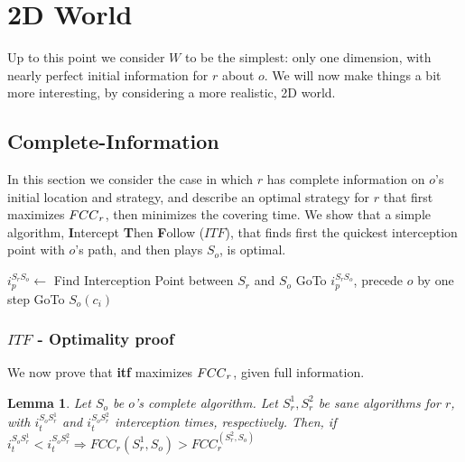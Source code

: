 \documentclass[a4paper,10pt]{article}
\newtheorem{lemma}[theorem]{Lemma}
\newcommand\rob{\ensuremath{r}\xspace}
\newcommand\opp{\ensuremath{o}\xspace}
\newcommand{\w}{\ensuremath{W}\xspace}
\newcommand{\fcc}{\ensuremath{FCC}\xspace}
\newcommand{\itf}{\ensuremath{ITF}\xspace}
\begin{document}
\newpage
\section{2D World}
Up to this point we consider \w to be the simplest: only one dimension, with nearly perfect initial information for \rob about \opp. We will now make things a bit more interesting, by considering a more realistic, 2D world.
\subsection{Complete-Information}
In this section we consider the case in which \rob has complete information on \opp's initial location and strategy, and describe an optimal strategy for \rob that first maximizes $\textnormal{\fcc}_r$, then minimizes the covering time. We show that a simple algorithm, \textbf{I}ntercept \textbf{T}hen \textbf{F}ollow (\itf),  that finds first the quickest interception point with \opp's path, and then plays $S_{\opp}$, is optimal.


\begin{algorithm}
\begin{algorithmic}
	\STATE $i_p^{S_{\rob} S_{\opp}} \leftarrow $ Find Interception Point between $S_{\rob}$ and $S_{\opp}$
    \STATE GoTo $i_p^{S_{\rob} S_{\opp}}$, precede \opp by one step
    \LOOP
        	\STATE GoTo $S_{\opp}(c_i)$
        \ENDIF
    \ENDLOOP
  
\end{algorithmic}
\caption{\itf\label{lss}}
\end{algorithm}

\subsubsection{\textbf{\itf} - Optimality proof}\label{subsection:ITF, optimality proof}
We now prove that \textbf{itf} maximizes $\textnormal{\fcc}_{\rob}$, given full information. 
\begin{lemma}\label{lemmas:ITF optimality lower i_t higher FCC}
Let $S_{\opp}$ be \opp's complete algorithm. Let $S_{\rob}^1,S_{\rob}^2$ be sane algorithms for \rob, with $i_t^{S_{\opp} S_{\rob}^1}$ and $i_t^{S_{\opp} S_{\rob}^2}$ interception times, respectively. Then, if $i_t^{S_{\opp} S_{\rob}^1} < i_t^{S_{\opp} S_{\rob}^2}\Rightarrow \fcc_{\rob}(S_{\rob}^1, S_{\opp}) > \fcc_{\rob}^(S_{\rob}^2, S_{\opp})$
\end{lemma}
\end{document}
